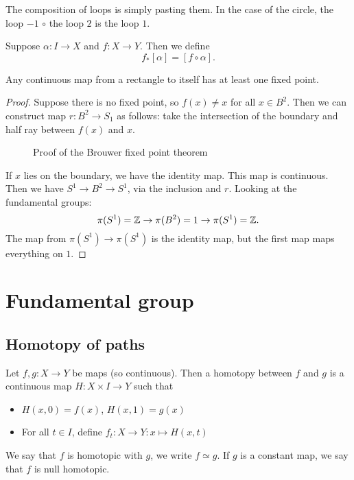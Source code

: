 The composition of loops is simply pasting them.
In the case of the circle, the loop $-1$  $\circ$ the loop  $2$ is the loop $1$.

Suppose $\alpha: I \to  X$ and $f : X\to Y$. Then we define 
\[
    f_*[\alpha] = [f \circ \alpha]
.\] 


\begin{theorem}
    Any continuous map from a rectangle to itself has at least one fixed point.
\end{theorem}
\begin{proof}
    Suppose there is no fixed point, so $f(x) \neq x$ for all  $x \in B^2$.
    Then we can construct map $r : B^2 \to  S_1$ as follows:
    take the intersection of the boundary and half ray between $f(x)$ and $x$.
    \begin{figure}[H]
        \centering
        \caption{Proof of the Brouwer fixed point theorem}
        \label{fig:proof-fixed-point-brouwer}
    \end{figure}
    If $x$ lies on the boundary, we have the identity map.
    This map is continuous.
    Then we have $S^1 \to B^2 \to S^1$, via the inclusion and $r$.
    Looking at the fundamental groups:
    \[
        \pi(S^1)  =\mathbb{Z} \to  \pi(B^2) = 1 \to  \pi(S^1) = \mathbb{Z}
    .\] 
    The map from $\pi(S^1) \to  \pi(S^{1})$ is the identity map, but the first map maps everything on $1$. \phantom\qedhere\hfill\contra 
\end{proof}



\setcounter{chapter}{8}
\chapter{Fundamental group}

\setcounter{section}{50}
\section{Homotopy of paths}
\begin{definition}[Homotopy]
    Let $f,g:X\to Y$ be maps (so continuous). Then a homotopy between $f$ and $g$ is a continuous map $H: X\times I \to Y$ such that
    \begin{itemize}
        \item $H(x, 0) = f(x)$, $H(x, 1) = g(x)$ 
        \item For all $t \in I$, define $f_t: X \to  Y: x \mapsto  H(x, t)$
    \end{itemize}
    We say that $f$ is homotopic with $g$, we write $f \simeq g$.
    If $g$ is a constant map, we say that $f$ is null homotopic.
\end{definition}

